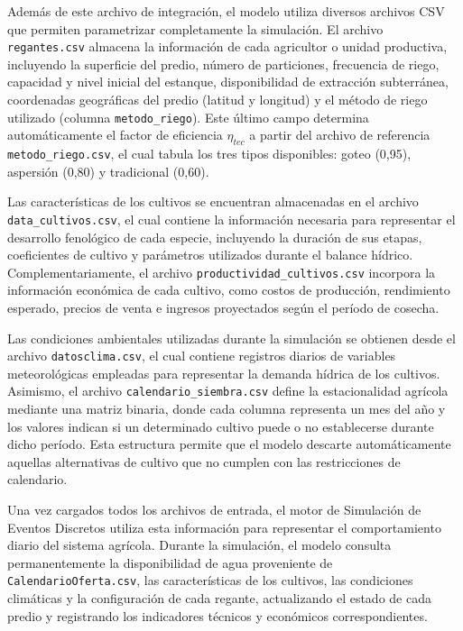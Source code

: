 \documentclass[12pt]{report}
\begin{document}
Además de este archivo de integración, el modelo utiliza diversos archivos CSV que permiten parametrizar completamente la simulación. El archivo \texttt{regantes.csv} almacena la información de cada agricultor o unidad productiva, incluyendo la superficie del predio, número de particiones, frecuencia de riego, capacidad y nivel inicial del estanque, disponibilidad de extracción subterránea, coordenadas geográficas del predio (latitud y longitud) y el método de riego utilizado (columna \texttt{metodo\_riego}). Este último campo determina automáticamente el factor de eficiencia $\eta_{tec}$ a partir del archivo de referencia \texttt{metodo\_riego.csv}, el cual tabula los tres tipos disponibles: goteo (0{,}95), aspersión (0{,}80) y tradicional (0{,}60).

Las características de los cultivos se encuentran almacenadas en el archivo \texttt{data\_cultivos.csv}, el cual contiene la información necesaria para representar el desarrollo fenológico de cada especie, incluyendo la duración de sus etapas, coeficientes de cultivo y parámetros utilizados durante el balance hídrico. Complementariamente, el archivo \texttt{productividad\_cultivos.csv} incorpora la información económica de cada cultivo, como costos de producción, rendimiento esperado, precios de venta e ingresos proyectados según el período de cosecha.

Las condiciones ambientales utilizadas durante la simulación se obtienen desde el archivo \texttt{datosclima.csv}, el cual contiene registros diarios de variables meteorológicas empleadas para representar la demanda hídrica de los cultivos. Asimismo, el archivo \texttt{calendario\_siembra.csv} define la estacionalidad agrícola mediante una matriz binaria, donde cada columna representa un mes del año y los valores indican si un determinado cultivo puede o no establecerse durante dicho período. Esta estructura permite que el modelo descarte automáticamente aquellas alternativas de cultivo que no cumplen con las restricciones de calendario.

Una vez cargados todos los archivos de entrada, el motor de Simulación de Eventos Discretos utiliza esta información para representar el comportamiento diario del sistema agrícola. Durante la simulación, el modelo consulta permanentemente la disponibilidad de agua proveniente de \texttt{CalendarioOferta.csv}, las características de los cultivos, las condiciones climáticas y la configuración de cada regante, actualizando el estado de cada predio y registrando los indicadores técnicos y económicos correspondientes.
\end{document}
